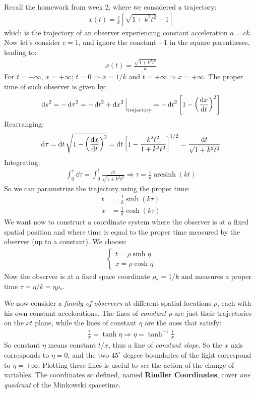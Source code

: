 \documentclass[../template.tex]{subfiles}
\begin{document}
Recall the homework from week 2, where we considered a trajectory:
\begin{align*}
    x(t) = \frac{c}{k} \left[\sqrt{1+ k^2 t^2} - 1\right] 
\end{align*}
which is the trajectory of an observer experiencing constant acceleration $a=c k$. Now let's consider $c=1$, and ignore the constant $-1$ in the square parentheses, leading to:
\begin{align*}
    x(t) = \frac{\sqrt{1+ k^2 t^2}}{k} 
\end{align*}    
For $t=-\infty$, $x=+\infty$; $t=0 \Rightarrow x=1/k$ and $t=+\infty \Rightarrow x=+\infty$.
The proper time of such observer is given by:
\begin{align*}
    \dd{s}^2 = -\dd{\tau}^2 = -\dd{t}^2 + \dd{x}^2 \Big|_{\mathrm{trajectory}} = - \dd{t}^2 \left[1- \left(\dv{x}{t}\right)^2\right] 
\end{align*}
Rearranging:
\begin{align*}
    \dd{\tau} = \dd{t} \sqrt{1-\left(\dv{x}{t}\right)^2} = \dd{t} \left[1-\frac{k^2t^2}{1 + k^2t^2} \right]^{1/2} = \frac{\dd{t}}{\sqrt{1+ k^2 t^2}} 
\end{align*}
Integrating:
\begin{align*}
    \int_0^\tau \dd{\tau} = \int_0^t \frac{\dd{t}}{\sqrt{1+ k^2 t^2}} \Rightarrow \tau = \frac{1}{k} \operatorname{arcsinh} (kt)  
\end{align*}
So we can parametrize the trajectory using the proper time:
\begin{align*}
    t &= \frac{1}{k} \sinh(k \tau)\\
    x &= \frac{1}{k} \cosh(k \tau)  
\end{align*}
We want now to construct a coordinate system where the observer is at a fixed spatial position and where time is equal to the proper time measured by the observer (up to a constant). We choose:
\begin{align*}
    \begin{cases}
        t = \rho \sinh \eta\\
        x = \rho \cosh \eta
    \end{cases}
\end{align*}
Now the observer is at a fixed space coordinate $\rho_* = 1/k$ and measures a proper time $\tau = \eta/k = \eta \rho_*$. 

We now consider a \textit{family of observers} at different spatial locations $\rho$, each with his own constant accelerations. The lines of \textit{constant $\rho$ } are just their trajectories on the $xt$ plane, while the lines of constant $\eta$ are the ones that satisfy:
\begin{align*}
    \frac{t}{x} = \tanh \eta \Rightarrow \eta= \tanh^{-1}\frac{t}{x}  
\end{align*}    
So constant $\eta$ means constant $t/x$, thus a line of \textit{constant slope}. So the $x$ axis corresponds to $\eta = 0$, and the two $45^\circ$ degree boundaries of the light correspond to $\eta = \pm \infty$. Plotting these lines is useful to \textit{see} the action of the change of variables.     
The coordinates so defined, named \textbf{Rindler Coordinates}, cover \textit{one quadrant} of the Minkowski spacetime. 
\end{document}
